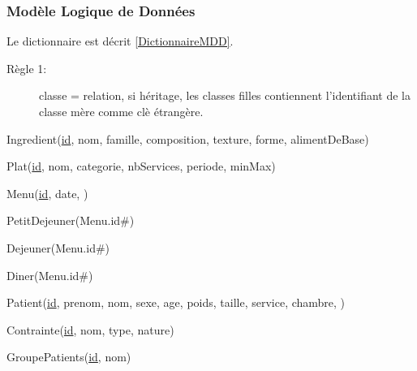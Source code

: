 \subsubsection{Modèle Logique de Données}
Le dictionnaire est décrit \autoref{DictionnaireMDD}.
\begin{description}
\item[Règle 1:] classe = relation, si héritage, les classes filles contiennent l'identifiant de la classe mère comme clè étrangère.
\end{description}

Ingredient(\underline{id}, nom, famille, composition, texture, forme, alimentDeBase)

Plat(\underline{id}, nom, categorie, nbServices, periode, minMax)

Menu(\underline{id}, date, )

PetitDejeuner(Menu.id\#)

Dejeuner(Menu.id\#)

Diner(Menu.id\#)

Patient(\underline{id}, prenom, nom, sexe, age, poids, taille, service, chambre, )

Contrainte(\underline{id}, nom, type, nature)

GroupePatients(\underline{id}, nom)






